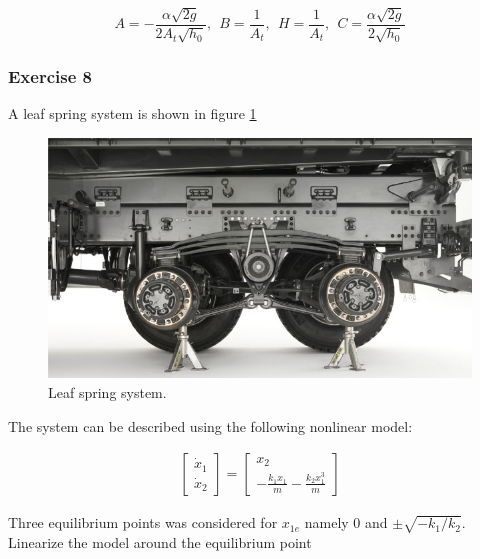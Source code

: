 \begin{equation}
A =-\frac{\alpha \sqrt{2g}}{2A_t\sqrt{h_0}}, ~~ B = \frac{1}{A_t}, ~~ H = \frac{1}{A_t}, ~~ C= \frac{\alpha \sqrt{2g}}{2\sqrt{h_0}} \nonumber
\end{equation}

\subsubsection{Exercise 8}

A leaf spring system is shown in figure \ref{Image_LeafSpringSuspension_01}

\begin{figure}[!htb]
\begin{center}
\includegraphics[scale=0.280]{img/state_feedback/Image_LeafSpringSuspension_01.jpg}
\end{center}
\caption{Leaf spring system.}
\label{Image_LeafSpringSuspension_01}
\end{figure}

The system can be described using the following nonlinear model: 

\begin{eqnarray}
\begin{bmatrix}
 \dot{x}_1\\
 \dot{x}_2
\end{bmatrix}= 
\begin{bmatrix}
 x_2  \\
 -\frac{k_1 x_1}{m} - \frac{k_2 x_{1}^3}{m}  
\end{bmatrix} \nonumber
\end{eqnarray}

Three equilibrium points was considered for $x_{1e}$ namely $0$ and $\pm \sqrt{-k_1/k_2}$. Linearize the model around the equilibrium point

